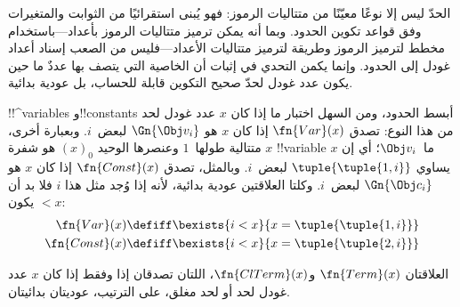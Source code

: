 \documentclass[../../../include/open-logic-section]{subfiles}
\begin{document}

\begin{explain}
الحدّ ليس إلا نوعًا معيّنًا من متتاليات الرموز: فهو يُبنى استقرائيًا من
الثوابت والمتغيرات وفق قواعد تكوين الحدود. وبما أنه يمكن ترميز متتاليات
الرموز بأعداد---باستخدام مخطط لترميز الرموز وطريقة لترميز متتاليات
الأعداد---فليس من الصعب إسناد أعداد غودل إلى الحدود. وإنما يكمن التحدي
في إثبات أن الخاصية التي يتصف بها عددٌ ما حين يكون عدد غودل لحدّ صحيح
التكوين قابلة للحساب، بل عودية بدائية.
\end{explain}

!!^{variable}s و!!{constant}s أبسط الحدود، ومن السهل اختبار ما إذا كان
$x$ عدد غودل لحد من هذا النوع: تصدق $\fn{Var}(x)$ إذا كان
$x$ هو $\Gn{\Obj v_i}$ لبعض~$i$. وبعبارة أخرى، $x$ متتالية طولها~$1$
وعنصرها الوحيد $(x)_0$ هو شفرة !!{variable} ما~$\Obj v_i$؛ أي إن $x$ يساوي
$\tuple{\tuple{1, i}}$ لبعض~$i$. وبالمثل، تصدق $\fn{Const}(x)$ إذا كان
$x$ هو $\Gn{\Obj c_i}$ لبعض~$i$. وكلتا العلاقتين عودية بدائية، لأنه
إذا وُجد مثل هذا $i$ فلا بد أن يكون $< x$:
\begin{align*}
  \fn{Var}(x) & \defiff \bexists{i<x}{x = \tuple{\tuple{1, i}}}\\
  \fn{Const}(x) & \defiff \bexists{i<x}{x = \tuple{\tuple{2, i}}}
\end{align*}

\begin{prop}
العلاقتان $\fn{Term}(x)$ و$\fn{ClTerm}(x)$، اللتان تصدقان إذا وفقط إذا
كان $x$ عدد غودل لحد أو لحد مغلق، على الترتيب، عوديتان بدائيتان.
\end{prop}
\end{document}

